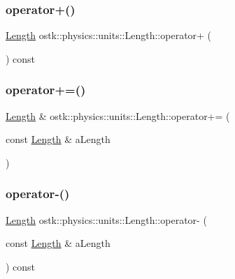 \mbox{\label{classostk_1_1physics_1_1units_1_1_length_af9407866f7c1663f70dbc88a6a1643e7}} 
\subsubsection{\texorpdfstring{operator+()}{operator+()}\hspace{0.1cm}{\footnotesize\ttfamily [2/2]}}
{\footnotesize\ttfamily \hyperlink{classostk_1_1physics_1_1units_1_1_length}{Length} ostk\+::physics\+::units\+::\+Length\+::operator+ (\begin{DoxyParamCaption}{ }\end{DoxyParamCaption}) const}

\mbox{\label{classostk_1_1physics_1_1units_1_1_length_a7903485eb0e4d3f92cdbd8436ecb5adc}} 
\subsubsection{\texorpdfstring{operator+=()}{operator+=()}}
{\footnotesize\ttfamily \hyperlink{classostk_1_1physics_1_1units_1_1_length}{Length} \& ostk\+::physics\+::units\+::\+Length\+::operator+= (\begin{DoxyParamCaption}\item[{const \hyperlink{classostk_1_1physics_1_1units_1_1_length}{Length} \&}]{a\+Length }\end{DoxyParamCaption})}

\mbox{\label{classostk_1_1physics_1_1units_1_1_length_a7ead71a73994b72fea9cbee1763c921f}} 
\subsubsection{\texorpdfstring{operator-\/()}{operator-()}\hspace{0.1cm}{\footnotesize\ttfamily [1/2]}}
{\footnotesize\ttfamily \hyperlink{classostk_1_1physics_1_1units_1_1_length}{Length} ostk\+::physics\+::units\+::\+Length\+::operator-\/ (\begin{DoxyParamCaption}\item[{const \hyperlink{classostk_1_1physics_1_1units_1_1_length}{Length} \&}]{a\+Length }\end{DoxyParamCaption}) const}

